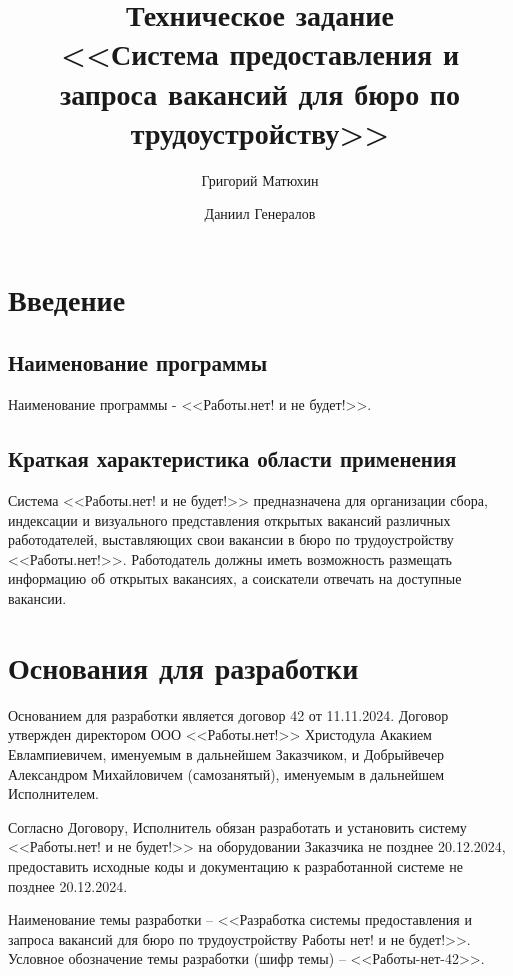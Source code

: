 \documentclass[a4page]{article}
\author{Григорий Матюхин \and Даниил Генералов}
\date{\DTMDisplaydate{2024}{2}{27}{-1}}
\title{Техническое задание\\ \Large<<Система предоставления и запроса вакансий для бюро по трудоустройству>>}
\begin{document}
\maketitle
\thispagestyle{empty}

\newpage

\tableofcontents

\newpage

\section{Введение}

\subsection{Наименование программы}

Наименование программы - <<Работы.нет! и не будет!>>.

\subsection{Краткая характеристика области применения}

Система <<Работы.нет! и не будет!>> предназначена для организации сбора, индексации и визуального представления открытых вакансий различных работодателей, выставляющих свои вакансии в бюро по трудоустройству <<Работы.нет!>>. Работодатель должны иметь возможность размещать информацию об открытых вакансиях, а соискатели отвечать на доступные вакансии.

\section{Основания для разработки}

Основанием для разработки является договор 42 от 11.11.2024. Договор утвержден директором ООО <<Работы.нет!>> Христодула Акакием Евлампиевичем, именуемым в дальнейшем Заказчиком, и Добрыйвечер Александром Михайловичем (самозанятый), именуемым в дальнейшем Исполнителем.

Согласно Договору, Исполнитель обязан разработать и установить систему <<Работы.нет! и не будет!>> на оборудовании Заказчика не позднее 20.12.2024, предоставить исходные коды и документацию к разработанной системе не позднее 20.12.2024.

Наименование темы разработки – <<Разработка системы предоставления и запроса вакансий для бюро по трудоустройству Работы нет! и не будет!>>.
Условное обозначение темы разработки (шифр темы) – <<Работы-нет-42>>.
\end{document}
